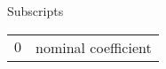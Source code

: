 \noindent
Subscripts
{\renewcommand\arraystretch{1.0}
	\noindent\begin{longtable*}{@{}l @{\quad=\quad} l@{}}
		$0$ & nominal coefficient 
\end{longtable*}}
\noindent
\begin{comment}
Superscripts
{\renewcommand\arraystretch{1.0}
	\noindent\begin{longtable*}{@{}l @{\quad=\quad} l@{}}
		$\hat{\pbox{1}}$ & normalized variable
\end{longtable*}}
\end{comment}

\begin{comment}
\noindent \textit{Subscript/Superscript}
{\renewcommand\arraystretch{1.0}
\noindent\begin{longtable*}{@{}l @{\quad=\quad} l@{}}
$0$ & nominal coefficient \\
$P$ & coefficient as a function of vehicle roll-rate \\ 
$Q$ & coefficient as a function of vehicle pitch-rate \\ 
$R$ & coefficient as a function of vehicle yaw-rate \\
$\alpha$ & coefficient as a function of angle of attack \\
$\alpha^2$ & coefficient as a function of the square of angle of attack \\
$\beta$ & coefficient as a function of angle of sideslip  \\ 
$\delta_{a}$ & coefficient as a function of aileron deflection angle \\
$\delta_{e}$ & coefficient as a function of elevator deflection angle \\
$\delta_{e}^{2}$ & coefficient as a function of the square of elevator deflection angle \\
$\delta_{r}$ & coefficient as a function of rudder deflection angle \\
$\dot{}$ & variable derivative with respect to time
\end{longtable*}}
\end{comment}